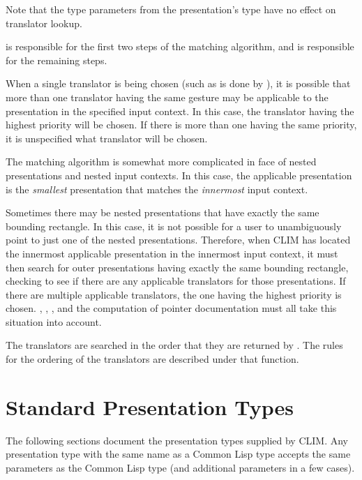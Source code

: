 Note that the type parameters from the presentation's type have no effect on
translator lookup.

 is responsible for the first two steps of the
matching algorithm, and  is responsible for the
remaining steps.

When a single translator is being chosen (such as is done by
), it is possible that more than one
translator having the same gesture may be applicable to the presentation in the
specified input context.  In this case, the translator having the highest
priority will be chosen.  If there is more than one having the same priority, it
is unspecified what translator will be chosen.

The matching algorithm is somewhat more complicated in face of nested
presentations and nested input contexts.  In this case, the applicable
presentation is the {\sl smallest} presentation that matches the {\sl innermost}
input context.

Sometimes there may be nested presentations that have exactly the same bounding
rectangle.  In this case, it is not possible for a user to unambiguously point
to just one of the nested presentations.  Therefore, when CLIM has located the
innermost applicable presentation in the innermost input context, it must then
search for outer presentations having exactly the same bounding rectangle,
checking to see if there are any applicable translators for those presentations.
If there are multiple applicable translators, the one having the highest
priority is chosen.  ,
, , and the
computation of pointer documentation must all take this situation into account.

The translators are searched in the order that they are returned by
.  The rules for the ordering of the
translators are described under that function.


\section {Standard Presentation Types}

The following sections document the presentation types supplied by CLIM.  Any
presentation type with the same name as a Common Lisp type accepts the same
parameters as the Common Lisp type (and additional parameters in a few cases).


